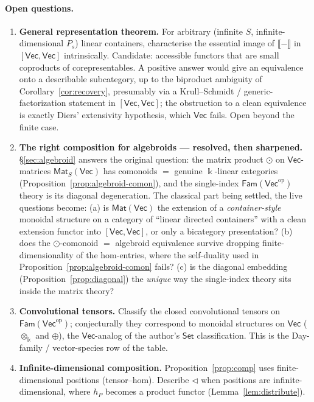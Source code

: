 \documentclass[11pt]{amsart}
\theoremstyle{plain}
\theoremstyle{definition}
\renewcommand{\Vec}{\mathsf{Vec}}
\newcommand{\Set}{\mathsf{Set}}
\newcommand{\Fam}{\mathsf{Fam}}
\newcommand{\Mat}{\mathsf{Mat}}
\newcommand{\op}{\mathrm{op}}
\newcommand{\ext}[1]{\llbracket #1 \rrbracket}
\newcommand{\fld}{\Bbbk}
\newcommand{\bul}{{-}}
\begin{document}
\paragraph{Open questions.}
\begin{enumerate}
\item \textbf{General representation theorem.} For arbitrary (infinite $S$,
  infinite-dimensional $P_s$) linear containers, characterise the essential
  image of $\ext{\bul}$ in $[\Vec,\Vec]$ intrinsically. Candidate: accessible
  functors that are small coproducts of corepresentables. A positive answer
  would give an equivalence onto a describable subcategory, up to the biproduct
  ambiguity of Corollary~\ref{cor:recovery}, presumably via a Krull--Schmidt /
  generic-factorization statement in $[\Vec,\Vec]$; the obstruction to a clean
  equivalence is exactly Diers' extensivity hypothesis, which $\Vec$ fails. Open
  beyond the finite case.
\item \textbf{The right composition for algebroids --- resolved, then sharpened.}
  \S\ref{sec:algebroid} answers the original question: the matrix product $\odot$ on
  $\Vec$-matrices $\Mat_S(\Vec)$ has comonoids $=$ genuine $\fld$-linear categories
  (Proposition~\ref{prop:algebroid-comon}), and the single-index $\Fam(\Vec^\op)$
  theory is its diagonal degeneration. The classical part being settled, the live
  questions become: (a) is $\Mat(\Vec)$ the extension of a \emph{container-style}
  monoidal structure on a category of ``linear directed containers'' with a clean
  extension functor into $[\Vec,\Vec]$, or only a bicategory presentation? (b) does
  the $\odot$-comonoid $=$ algebroid equivalence survive dropping
  finite-dimensionality of the hom-entries, where the self-duality used in
  Proposition~\ref{prop:algebroid-comon} fails? (c) is the diagonal embedding
  (Proposition~\ref{prop:diagonal}) the \emph{unique} way the single-index theory
  sits inside the matrix theory?
\item \textbf{Convolutional tensors.} Classify the closed convolutional tensors
  on $\Fam(\Vec^\op)$; conjecturally they correspond to monoidal structures on
  $\Vec$ ($\otimes_\fld$ and $\oplus$), the $\Vec$-analog of the author's $\Set$
  classification. This is the Day-family / vector-species row of the table.
\item \textbf{Infinite-dimensional composition.} Proposition~\ref{prop:comp}
  uses finite-dimensional positions (tensor--hom). Describe $\lhd$ when
  positions are infinite-dimensional, where $h_P$ becomes a product functor
  (Lemma~\ref{lem:distribute}).
\end{enumerate}
\end{document}
